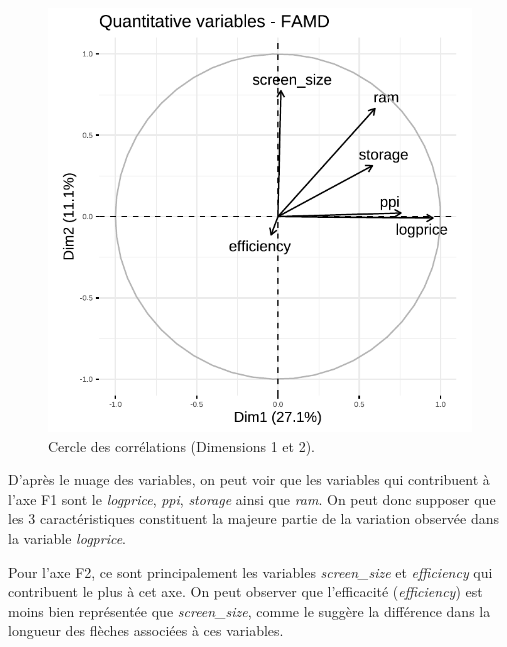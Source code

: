\documentclass[
  12pt,
]{report}
\begin{document}
\begin{figure}[H]

{\centering \includegraphics{report_files/figure-pdf/unnamed-chunk-17-1.pdf}

}

\caption{Cercle des corrélations (Dimensions 1 et 2).}

\end{figure}%

D'après le nuage des variables, on peut voir que les variables qui
contribuent à l'axe F1 sont le \emph{logprice}, \emph{ppi},
\emph{storage} ainsi que \emph{ram}. On peut donc supposer que les 3
caractéristiques constituent la majeure partie de la variation observée
dans la variable \emph{logprice}.

Pour l'axe F2, ce sont principalement les variables \emph{screen\_size}
et \emph{efficiency} qui contribuent le plus à cet axe. On peut observer
que l'efficacité (\emph{efficiency}) est moins bien représentée que
\emph{screen\_size}, comme le suggère la différence dans la longueur des
flèches associées à ces variables.
\end{document}
